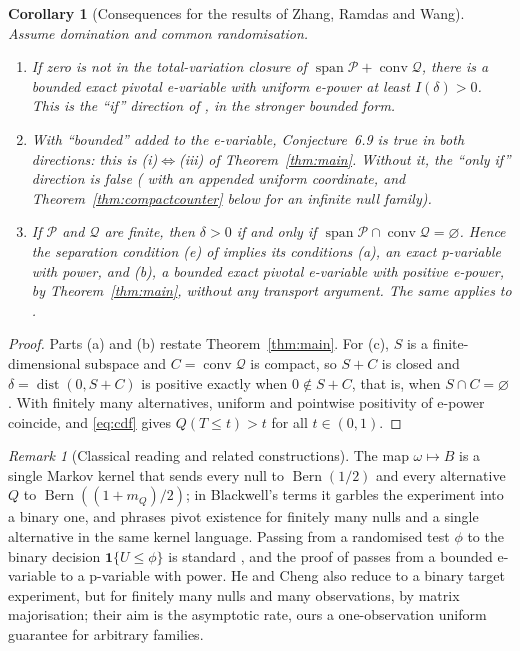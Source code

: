 \documentclass[11pt,a4paper]{article}
\newtheorem{corollary}[theorem]{Corollary}
\theoremstyle{definition}
\theoremstyle{remark}
\newtheorem{remark}[theorem]{Remark}
\newcommand{\PP}{\mathcal P}
\newcommand{\QQ}{\mathcal Q}
\newcommand{\one}{\mathbf 1}
\newcommand{\conv}{\operatorname{conv}}
\newcommand{\spn}{\operatorname{span}}
\newcommand{\dist}{\operatorname{dist}}
\newcommand{\Bern}{\operatorname{Bern}}
\begin{document}
\begin{corollary}[Consequences for the results of Zhang, Ramdas and Wang]\label{cor:zrw}
Assume domination and common randomisation.
\begin{enumerate}[label=(\alph*)]
\item If zero is not in the total-variation closure of \(\spn\PP+\conv\QQ\), there is a bounded exact pivotal e-variable with uniform e-power at least \(I(\delta)>0\). This is the ``if'' direction of \cite[Conjecture~6.9]{ZRW}, in the stronger bounded form.
\item With ``bounded'' added to the e-variable, Conjecture~6.9 is true in both directions: this is (i)\(\Leftrightarrow\)(iii) of Theorem~\ref{thm:main}. Without it, the ``only if'' direction is false (\cite[Example~5.1]{GROW} with an appended uniform coordinate, and Theorem~\ref{thm:compactcounter} below for an infinite null family).
\item If \(\PP\) and \(\QQ\) are finite, then \(\delta>0\) if and only if \(\spn\PP\cap\conv\QQ=\varnothing\). Hence the separation condition (e) of \cite[Theorem~6.1]{ZRW} implies its conditions (a), an exact p-variable with power, and (b), a bounded exact pivotal e-variable with positive e-power, by Theorem~\ref{thm:main}, without any transport argument. The same applies to \cite[Theorem~14.6]{RamdasWang}.
\end{enumerate}
\end{corollary}
\begin{proof}
Parts (a) and (b) restate Theorem~\ref{thm:main}. For (c), \(S\) is a finite-dimensional subspace and \(C=\conv\QQ\) is compact, so \(S+C\) is closed and \(\delta=\dist(0,S+C)\) is positive exactly when \(0\notin S+C\), that is, when \(S\cap C=\varnothing\). With finitely many alternatives, uniform and pointwise positivity of e-power coincide, and \eqref{eq:cdf} gives \(Q(T\le t)>t\) for all \(t\in(0,1)\).
\end{proof}

\begin{remark}[Classical reading and related constructions]\label{rem:classical}
The map \(\omega\mapsto B\) is a single Markov kernel that sends every null to \(\Bern(1/2)\) and every alternative \(Q\) to \(\Bern((1+m_Q)/2)\); in Blackwell's terms \cite{Blackwell} it garbles the experiment into a binary one, and \cite[Proposition~3.3]{ZRW} phrases pivot existence for finitely many nulls and a single alternative in the same kernel language. Passing from a randomised test \(\phi\) to the binary decision \(\one\{U\le\phi\}\) is standard \cite[Section~3.1]{RamdasWang}, and the proof of \cite[Theorem~3.9]{RamdasWang} passes from a bounded e-variable to a p-variable with power. He and Cheng \cite{HeCheng} also reduce to a binary target experiment, but for finitely many nulls and many observations, by matrix majorisation; their aim is the asymptotic rate, ours a one-observation uniform guarantee for arbitrary families.
\end{remark}
\end{document}
